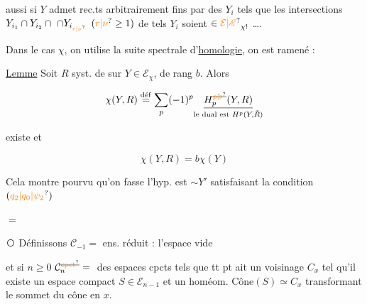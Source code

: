   aussi si  $Y$  admet  rec.ts arbitrairement fins  par des $Y_i$  tels que les intersections $Y_{i_1}\cap Y_{i_2}\cap\ \cap Y_{i_{\unsure{r|\nu}}}$ $(\unsure{r|\nu}\geq1)$ de tels $Y_i$ soient $\in\unsure{\mathcal E|\mathscr E}_{\chi!}$ \ldots.

Dans le cas  $\chi$, on utilise la suite spectrale d'\uline{homologie}, on est ramené :

\uline{Lemme} Soit $R$ syst.  de  sur $Y\in\mathcal E_\chi$,  de rang  $b$. Alors

\[
\chi(Y,R)\overset{\mathrm{d\acute ef}}{=}\sum_p(-1)^p
\underset{\text{le dual est }H^p(Y,\check R)}{\underline{H_p^{\deleted{\unsure{p|\flat}}}(Y,R)}}
\]

existe et

\[
\chi(Y,R)=b\chi(Y)
\]

Cela montre pourvu qu'on fasse l'hyp.   est $\sim Y'$ satisfaisant la condition $(\unsure{q_2|q_{0}|\psi_2})$
\begin{center}$=$\end{center}


\textcircled{} Définissons $\mathcal C_{-1}={}$ ens. réduit : l'espace vide

et si $n\geq0$ $\mathcal C_n^{\deleted{\unsure{\mathrm{cpct}}}}={}$   des espaces cpcts  tels que tt pt  ait un voisinage $C_x$ tel qu'il existe un espace compact $S\in\mathcal E_{n-1}$ et un homéom. $\mathrm{Cône}(S)\simeq C_x$ transformant le sommet du cône en $x$.



